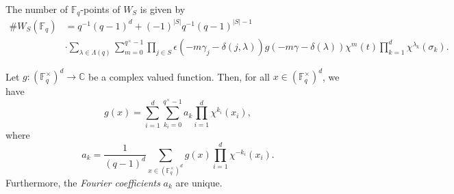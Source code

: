 \documentclass[10pt,a4paper]{amsart}
\newcommand{\F}{\mathbb{F}}
\begin{document}
\begin{prop}\label{prop:main-count}
The number of $\F_q$-points of $W_S$ is given by
\begin{align*}
     \#W_{S} (\mathbb{F}_q) &= q^{-1}(q-1)^{d} + (-1)^{|S|}q^{-1}(q-1)^{|S|-1} \\
     &\cdot \sum_{\lambda \in \Lambda(q)}   \sum_{m=0}^{q^\times-1} \prod_{j\in S} \epsilon\left( -m \gamma_j -\delta(j,\lambda) \right) g\left(-m\gamma - \delta(\lambda)\right) \chi^{m}(t) \prod_{k=1}^d \chi^{\lambda_k}(\sigma_k).
\end{align*}
\end{prop}

\begin{lem}\label{lem:fourier-series}
Let $g: \left(\F_{q}^{\times}\right)^{d} \to \mathbb{C}$ be a complex valued function. Then, for all $x \in \left(\F_{q}^{\times}\right)^{d}$, we have
\[
g(x) = \sum_{i=1}^d \sum_{k_i =0}^{q^\times -1} a_k \prod_{i=1}^d \chi^{k_i}(x_i),
\]
where 
\[
a_k = \frac{1}{(q-1)^{d}}\sum_{x \in (\F_q^{\times})^{d} } g(x) \prod_{i=1}^d\chi^{-k_i}(x_i).
\]
Furthermore, the \emph{Fourier coefficients} $a_k$ are unique. 
\end{lem}
\end{document}
